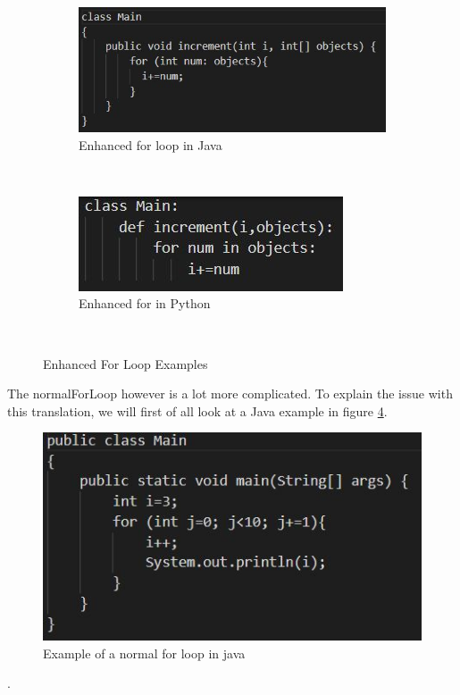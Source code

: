 \documentclass{l4proj}
\begin{document}
\begin{figure}[htb] 
    \centering
    \begin{subfigure}[b]{0.45\textwidth}
        \includegraphics[width=\textwidth]{images/enhancedForJava.JPG}
        \caption{Enhanced for loop in Java}
        \label{fig:enhancedForJava}
    \end{subfigure}
    ~ %
    \begin{subfigure}[b]{0.45\textwidth}
        \includegraphics[width=\textwidth]{images/enhancedForPython.JPG}
        \caption{Enhanced for in Python}
        \label{fig:enhancedForPython}
    \end{subfigure}
    ~ %
    \caption{Enhanced For Loop Examples
    }\label{fig:enhancedFor}
\end{figure}

The normalForLoop however is a lot more complicated. To explain the issue with this translation, we will first of all look at a Java example in figure \ref{fig:normalForJava}.

\begin{figure}[htb]
    \centering
    \includegraphics[width=1\linewidth]{images/normalForJava.JPG}
        \caption{Example of a normal for loop in java
    }
    \label{fig:normalForJava} 
\end{figure}.
\end{document}
